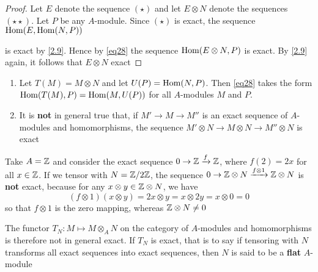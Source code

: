 \documentclass[11pt]{article}
\begin{document}
\begin{proof}
Let \(E\) denote the sequence \((\star)\) and let \(E\otimes N\) denote the sequences \((\star\star)\).
Let \(P\) be any \(A\)-module. Since \((\star)\) is exact, the sequence \(\operatorname{Hom}(E,\operatorname{Hom}(N,P))\)
\begin{center}\end{center}
is exact by \ref{2.9}. Hence by \eqref{eq28} the sequence \(\operatorname{Hom}(E\otimes N,P)\) is exact. By \ref{2.9}
again, it follows that \(E\otimes N\) exact
\end{proof}

\begin{remark}
\begin{enumerate}
\item Let \(T(M)=M\otimes N\) and let \(U(P)=\operatorname{Hom}(N,P)\). Then \eqref{eq28} takes the
form \(\operatorname{Hom}(T(M),P)=\operatorname{Hom}(M,U(P))\) for all \(A\)-modules \(M\) and \(P\).

\label{Problem3}

\item It is \textbf{not} in general true that, if \(M'\to M\to M''\) is an exact sequence of \(A\)-modules and
homomorphisms, the sequence \(M'\otimes N\to M\otimes N\to M''\otimes N\) is exact
\end{enumerate}
\end{remark}

\begin{examplle}[]
Take \(A=\mathbb{Z}\) and consider the exact sequence \(0\to\mathbb{Z}\xrightarrow{f}\mathbb{Z}\), where \(f(2)=2x\) for all \(x\in\mathbb{Z}\). If
we tensor with \(N=\mathbb{Z}/2\mathbb{Z}\), the sequence \(0\to\mathbb{Z}\otimes N\xrightarrow{f\otimes 1}\mathbb{Z}\otimes N\) is \textbf{not} exact, because for
any \(x\otimes y\in\mathbb{Z}\otimes N\), we have
\begin{equation*}
(f\otimes 1)(x\otimes y)=2x\otimes y=x\otimes 2y=x\otimes 0=0
\end{equation*}
so that \(f\otimes 1\) is the zero mapping, whereas \(\mathbb{Z}\otimes N\neq 0\)
\end{examplle}

The functor \(T_N:M\mapsto M\otimes_AN\) on the category of \(A\)-modules and homomorphisms is therefore not
in general exact. If \(T_N\) is exact, that is to say if tensoring with \(N\) transforms all
exact sequences into exact sequences, then \(N\) is said to be a \textbf{flat} \(A\)-module
\end{document}
